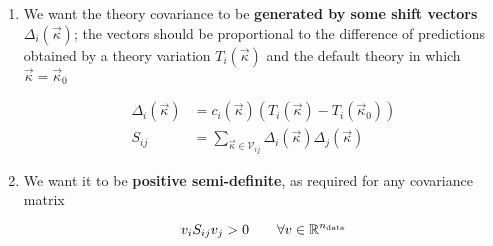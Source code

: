 \begin{enumerate}[label=\Alph*.]
    \item We want the theory covariance to be \textbf{generated by some shift
        vectors} $\Delta_i(\vec{\kappa})$; the vectors should be proportional
        to the difference of predictions obtained by a theory variation
        $T_i(\vec{\kappa})$ and the default theory in which $\vec{\kappa} =
        \vec{\kappa}_0$

        \begin{align}
            \Delta_i(\vec{\kappa}) &= c_i(\vec{\kappa}) \left(T_i(\vec{\kappa}) - T_i(\vec{\kappa}_0)\right)
            \label{eq:mhou/prescr/shifts}\\
            S_{ij} &= \sum_{\vec{\kappa} \in \mathcal{V}_{ij}} \Delta_i(\vec{\kappa})\Delta_j(\vec{\kappa})
            \label{eq:mhou/prescr/thcovmat}
        \end{align}
    \item We want it to be \textbf{positive semi-definite}, as required for any
        covariance matrix

        \begin{equation}
            \label{eq:mhou/prescr/pos}
            v_i S_{ij} v_j > 0 \qquad \forall v \in \mathbb{R}^{n_{\text{data}}} 
        \end{equation}
\end{enumerate}
